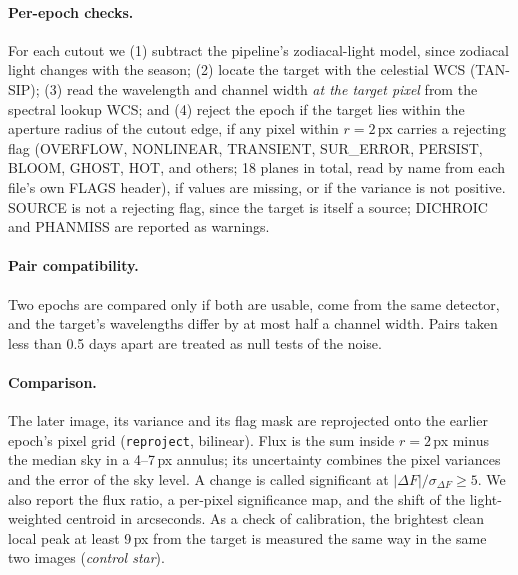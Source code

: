 \documentclass[11pt,a4paper]{article}
\begin{document}
\paragraph{Per-epoch checks.} For each cutout we (1) subtract the pipeline's zodiacal-light model, since zodiacal
light changes with the season; (2) locate the target with the celestial WCS (TAN-SIP); (3) read the wavelength and
channel width \emph{at the target pixel} from the spectral lookup WCS; and (4) reject the epoch if the target lies
within the aperture radius of the cutout edge, if any pixel within $r=2$\,px carries a rejecting flag (OVERFLOW,
NONLINEAR, TRANSIENT, SUR\_ERROR, PERSIST, BLOOM, GHOST, HOT, and others; 18 planes in total, read by name from each
file's own FLAGS header), if values are missing, or if the variance is not positive. SOURCE is not a rejecting flag,
since the target is itself a source; DICHROIC and PHANMISS are reported as warnings.

\paragraph{Pair compatibility.} Two epochs are compared only if both are usable, come from the same detector, and
the target's wavelengths differ by at most half a channel width. Pairs taken less than 0.5 days apart are treated as
null tests of the noise.

\paragraph{Comparison.} The later image, its variance and its flag mask are reprojected onto the earlier epoch's
pixel grid (\texttt{reproject}, bilinear). Flux is the sum inside $r=2$\,px minus the median sky in a 4--7\,px
annulus; its uncertainty combines the pixel variances and the error of the sky level. A change is called significant
at $|\Delta F|/\sigma_{\Delta F}\ge5$. We also report the flux ratio, a per-pixel significance map, and the shift of the
light-weighted centroid in arcseconds. As a check of calibration, the brightest clean local peak at least 9\,px from
the target is measured the same way in the same two images (\emph{control star}).
\end{document}
